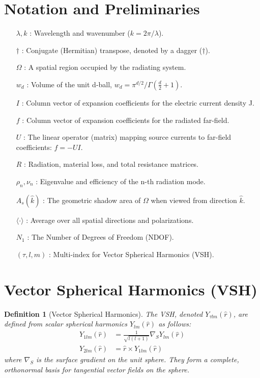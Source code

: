 \documentclass[11pt,a4paper]{article}
\newcommand{\herm}{\dagger} %
\newcommand{\avg}[1]{\langle #1 \rangle} %
\newtheorem{definition}[theorem]{Definition}
\begin{document}
\section{Notation and Preliminaries}

\begin{itemize}
    \item[\(\lambda, k\)]: Wavelength and wavenumber ($k=2\pi/\lambda$).
    \item[\(\herm\)]: Conjugate (Hermitian) transpose, denoted by a dagger (\(\herm\)).
    \item[\(\Omega\)]: A spatial region occupied by the radiating system.
    \item[\(w_{d}\)]: Volume of the unit d-ball, \(w_{d}=\pi^{d/2}/\Gamma(\frac{d}{2}+1)\).
    \item[\(I\)]: Column vector of expansion coefficients for the electric current density J.
    \item[\(f\)]: Column vector of expansion coefficients for the radiated far-field.
    \item[\(U\)]: The linear operator (matrix) mapping source currents to far-field coefficients: \(f = -UI\).
    \item[\(R\)]: Radiation, material loss, and total resistance matrices.
    \item[\(\rho_{n}, \nu_{n}\)]: Eigenvalue and efficiency of the n-th radiation mode.
    \item[\(A_{s}(\hat{k})\)]: The geometric shadow area of \(\Omega\) when viewed from direction \(\hat{k}\).
    \item[\(\avg{\cdot}\)]: Average over all spatial directions and polarizations.
    \item[\(N_{1}\)]: The Number of Degrees of Freedom (NDOF).
    \item[\((\tau, l, m)\)]: Multi-index for Vector Spherical Harmonics (VSH).
\end{itemize}

\section{Vector Spherical Harmonics (VSH)}

\begin{definition}[Vector Spherical Harmonics]
The VSH, denoted \(Y_{\tau lm}(\hat{r})\), are defined from scalar spherical harmonics \(Y_{lm}(\hat{r})\) as follows:
\begin{align}
    Y_{1lm}(\hat{r}) &= \frac{1}{\sqrt{l(l+1)}}\nabla_{S}Y_{lm}(\hat{r}) \\
    Y_{2lm}(\hat{r}) &= \hat{r}\times Y_{1lm}(\hat{r})
\end{align}
where \(\nabla_{S}\) is the surface gradient on the unit sphere. They form a complete, orthonormal basis for tangential vector fields on the sphere.
\end{definition}
\end{document}
